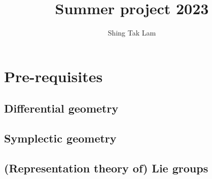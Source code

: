 \documentclass{report}
\title{Summer project 2023}
\author{Shing Tak Lam}
\begin{document}
\maketitle

\tableofcontents

\part{Pre-requisites}

\chapter{Differential geometry}










\chapter{Symplectic geometry}







\chapter{(Representation theory of) Lie groups}


\end{document}
